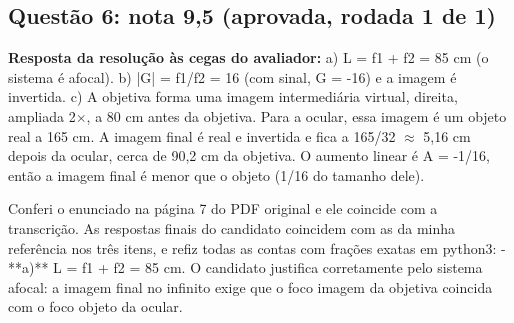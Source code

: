\documentclass{article}%
\begin{document}
\subsection*{Questão 6: nota 9,5 (aprovada, rodada 1 de 1)}%
\textbf{Resposta da resolução às cegas do avaliador:} a) L = f1 + f2 = 85 cm (o sistema é afocal).\newline%
b) |G| = f1/f2 = 16 (com sinal, G = -16) e a imagem é invertida.\newline%
c) A objetiva forma uma imagem intermediária virtual, direita, ampliada 2$\times$, a 80 cm antes da objetiva. Para a ocular, essa imagem é um objeto real a 165 cm. A imagem final é real e invertida e fica a 165/32 $\approx$ 5,16 cm depois da ocular, cerca de 90,2 cm da objetiva. O aumento linear é A = -1/16, então a imagem final é menor que o objeto (1/16 do tamanho dele).\par %
Conferi o enunciado na página 7 do PDF original e ele coincide com a transcrição. As respostas finais do candidato coincidem com as da minha referência nos três itens, e refiz todas as contas com frações exatas em python3:\newline%
{-} **a)** L = f1 + f2 = 85 cm. O candidato justifica corretamente pelo sistema afocal: a imagem final no infinito exige que o foco imagem da objetiva coincida com o foco objeto da ocular.\newline%
\end{document}
